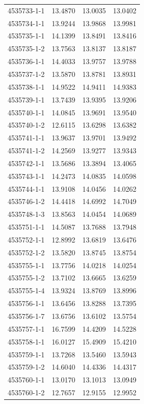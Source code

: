 \begin{longtable}{lrrr}
4535733-1-1 & 13.4870 & 13.0035 & 13.0402 \\
4535734-1-1 & 13.9244 & 13.9868 & 13.9981 \\
4535735-1-1 & 14.1399 & 13.8491 & 13.8416 \\
4535735-1-2 & 13.7563 & 13.8137 & 13.8187 \\
4535736-1-1 & 14.4033 & 13.9757 & 13.9788 \\
4535737-1-2 & 13.5870 & 13.8781 & 13.8931 \\
4535738-1-1 & 14.9522 & 14.9411 & 14.9383 \\
4535739-1-1 & 13.7439 & 13.9395 & 13.9206 \\
4535740-1-1 & 14.0845 & 13.9691 & 13.9540 \\
4535740-1-2 & 12.6115 & 13.6298 & 13.6382 \\
4535741-1-1 & 13.9637 & 13.9701 & 13.9492 \\
4535741-1-2 & 14.2569 & 13.9277 & 13.9343 \\
4535742-1-1 & 13.5686 & 13.3894 & 13.4065 \\
4535743-1-1 & 14.2473 & 14.0835 & 14.0598 \\
4535744-1-1 & 13.9108 & 14.0456 & 14.0262 \\
4535746-1-2 & 14.4418 & 14.6992 & 14.7049 \\
4535748-1-3 & 13.8563 & 14.0454 & 14.0689 \\
4535751-1-1 & 14.5087 & 13.7688 & 13.7948 \\
4535752-1-1 & 12.8992 & 13.6819 & 13.6476 \\
4535752-1-2 & 13.5820 & 13.8745 & 13.8754 \\
4535755-1-1 & 13.7756 & 14.0218 & 14.0254 \\
4535755-1-2 & 13.7102 & 13.6665 & 13.6259 \\
4535755-1-4 & 13.9324 & 13.8769 & 13.8996 \\
4535756-1-1 & 13.6456 & 13.8288 & 13.7395 \\
4535756-1-7 & 13.6756 & 13.6102 & 13.5754 \\
4535757-1-1 & 16.7599 & 14.4209 & 14.5228 \\
4535758-1-1 & 16.0127 & 15.4909 & 15.4210 \\
4535759-1-1 & 13.7268 & 13.5460 & 13.5943 \\
4535759-1-2 & 14.6040 & 14.4336 & 14.4317 \\
4535760-1-1 & 13.0170 & 13.1013 & 13.0949 \\
4535760-1-2 & 12.7657 & 12.9155 & 12.9952 \\

\end{longtable}
